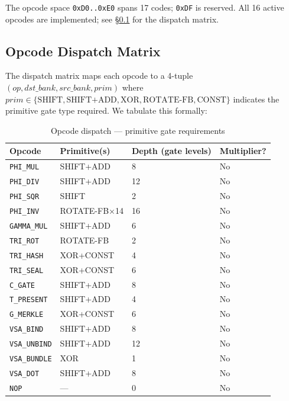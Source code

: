 The opcode space \texttt{0xD0..0xE0} spans 17 codes; \texttt{0xDF} is
reserved.  All 16 active opcodes are implemented; see
\S\ref{subsec:71:dispatch-matrix} for the dispatch matrix.

\subsection{Opcode Dispatch Matrix}
\label{subsec:71:dispatch-matrix}

The dispatch matrix maps each opcode to a 4-tuple
$(\mathit{op}, \mathit{dst\_bank}, \mathit{src\_bank}, \mathit{prim})$
where $\mathit{prim} \in \{\text{SHIFT}, \text{SHIFT+ADD}, \text{XOR},
\text{ROTATE-FB}, \text{CONST}\}$ indicates the primitive gate type
required.  We tabulate this formally:

\begin{table}[H]
\centering
\caption{Opcode dispatch — primitive gate requirements}
\label{tab:71:dispatch}
\small
\begin{tabular}{llll}
\toprule
Opcode & Primitive(s) & Depth (gate levels) & Multiplier? \\
\midrule
\texttt{PHI\_MUL}    & SHIFT+ADD   & 8  & No \\
\texttt{PHI\_DIV}    & SHIFT+ADD   & 12 & No \\
\texttt{PHI\_SQR}    & SHIFT       & 2  & No \\
\texttt{PHI\_INV}    & ROTATE-FB×14& 16 & No \\
\texttt{GAMMA\_MUL}  & SHIFT+ADD   & 6  & No \\
\texttt{TRI\_ROT}    & ROTATE-FB   & 2  & No \\
\texttt{TRI\_HASH}   & XOR+CONST   & 4  & No \\
\texttt{TRI\_SEAL}   & XOR+CONST   & 6  & No \\
\texttt{C\_GATE}     & SHIFT+ADD   & 8  & No \\
\texttt{T\_PRESENT}  & SHIFT+ADD   & 4  & No \\
\texttt{G\_MERKLE}   & XOR+CONST   & 6  & No \\
\texttt{VSA\_BIND}   & SHIFT+ADD   & 8  & No \\
\texttt{VSA\_UNBIND} & SHIFT+ADD   & 12 & No \\
\texttt{VSA\_BUNDLE} & XOR         & 1  & No \\
\texttt{VSA\_DOT}    & SHIFT+ADD   & 8  & No \\
\texttt{NOP}         & —           & 0  & No \\
\bottomrule
\end{tabular}
\end{table}

